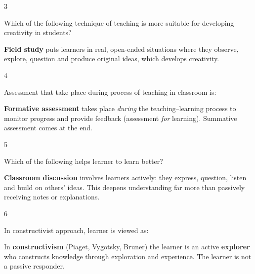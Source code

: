\begin{question}{3}
{Which of the following technique of teaching is more suitable for developing creativity in students?\par}
\begin{explain}
\textbf{Field study} puts learners in real, open-ended situations where they observe, explore, question and produce original ideas, which develops creativity.
\end{explain}
\end{question}

\begin{question}{4}
{Assessment that take place during process of teaching in classroom is:\par}
\begin{explain}
\textbf{Formative assessment} takes place \emph{during} the teaching--learning process to monitor progress and provide feedback (assessment \emph{for} learning). Summative assessment comes at the end.
\end{explain}
\end{question}

\begin{question}{5}
{Which of the following helps learner to learn better?\par}
\begin{explain}
\textbf{Classroom discussion} involves learners actively: they express, question, listen and build on others' ideas. This deepens understanding far more than passively receiving notes or explanations.
\end{explain}
\end{question}

\begin{question}{6}
{In constructivist approach, learner is viewed as:\par}
\begin{explain}
In \textbf{constructivism} (Piaget, Vygotsky, Bruner) the learner is an active \textbf{explorer} who constructs knowledge through exploration and experience. The learner is not a passive responder.
\end{explain}
\end{question}

